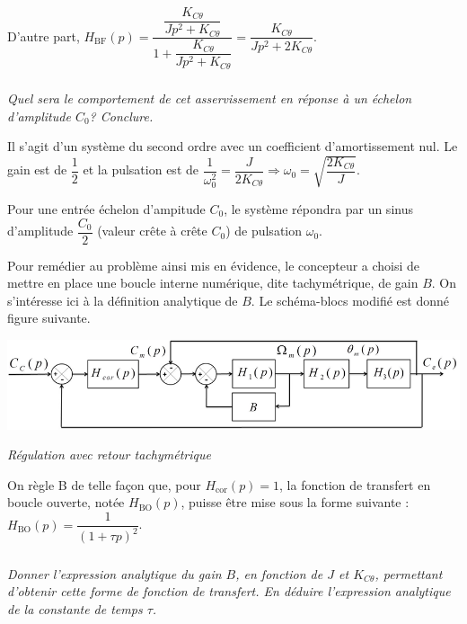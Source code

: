\documentclass[10pt,fleqn]{article} %
\begin{document}
\begin{multicols}{2}
\begin{corrige}
D'autre part, $H_{\text{BF}}(p)
=\dfrac{\dfrac{K_{C\theta}}{Jp^2+K_{C\theta}}}{1+\dfrac{K_{C\theta}}{Jp^2+K_{C\theta}}}=\dfrac{K_{C\theta}}{Jp^2+2K_{C\theta}}$.

\end{corrige}
\else
\fi

\subparagraph{}
\textit{Quel sera le comportement de cet asservissement en réponse à un échelon d'amplitude $C_0$?
Conclure.}
\ifprof
\begin{corrige}
Il s'agit d'un système du second ordre avec un coefficient d'amortissement nul. Le gain est de $\dfrac{1}{2}$ et la pulsation est de $\dfrac{1}{\omega_0^2}=\dfrac{J}{2K_{C\theta}} \Rightarrow \omega_0=\sqrt{\dfrac{2K_{C\theta}}{J}}$.

Pour une entrée échelon d'ampitude $C_0$, le système répondra par un sinus d'amplitude $\dfrac{C_0}{2}$ (valeur crête à crête $C_0$) de pulsation $\omega_0$.
\end{corrige}
\else
\fi


\ifprof
\else
Pour remédier au problème ainsi mis en évidence, le concepteur a choisi de mettre en place une boucle
interne numérique, dite tachymétrique, de gain $B$. On s’intéresse ici à la définition analytique de $B$.
Le schéma-blocs modifié est donné figure suivante.


\begin{center}
\includegraphics[width=.9\linewidth]{images/Sujet/images/fig_07}

\textit{Régulation avec retour tachymétrique}
\end{center}


On règle B de telle façon que, pour $H_{\text{cor}}(p)=1$, la fonction de transfert en boucle ouverte, notée $H_{\text{BO}}(p)$, puisse être mise sous la forme suivante : 
$H_{\text{BO}}(p)=\dfrac{1}{\left(1+\tau p\right)^2}$.

\fi

\subparagraph{}
\textit{Donner l’expression analytique du gain $B$, en fonction de $J$ et $K_{C\theta}$, permettant d’obtenir cette
forme de fonction de transfert. En déduire l’expression analytique de la constante de temps $\tau$.}
\ifprof
\begin{corrige}~\\


\end{corrige}
\end{multicols}
\end{document}
